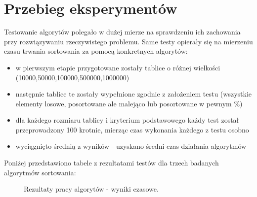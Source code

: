 \documentclass[10pt,a4paper]{article} %
\begin{document}
	\section{Przebieg eksperymentów}
	Testowanie algorytów polegało w dużej mierze na sprawdzeniu ich zachowania przy rozwiązywaniu rzeczywistego problemu. Same testy opierały się na mierzeniu czasu trwania sortowania za pomocą konkretnych algorytów:
	\begin{itemize}
		\item w pierwszym etapie przygotowane zostały tablice o różnej wielkości (10000,50000,100000,500000,1000000)
		\item następnie tablice te zostały wypełnione zgodnie z założeniem testu (wszystkie elementy losowe, posortowane ale malejąco lub posortowane w pewnym $ \% $)
		\item dla każdego rozmiaru tablicy i kryterium podstawowego każdy test został przeprowadzony 100 krotnie, mierząc czas wykonania każdego z testu osobno
		\item wyciągnięto średnią z wyników - uzyskano średni czas działania algorytmów
	\end{itemize}
	Poniżej przedstawiono tabele z rezultatami testów dla trzech badanych algorytmów sortowania: 
	\begin{figure}[!ht]
		\centering
		\caption{Rezultaty pracy algorytów - wyniki czasowe.}
		\label{fig:obraz2}
	\end{figure}
\end{document}
